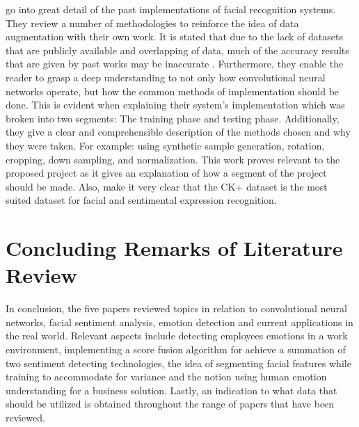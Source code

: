 \citeauthor{LOPES} go into great detail of the past implementations of facial recognition systems. They review a number of methodologies to reinforce the idea of data augmentation with their own work. It is stated that due to the lack of datasets that are publicly available and overlapping of data, much of the accuracy results that are given by past works may be inaccurate \citep{LOPES}. Furthermore, they enable the reader to grasp a deep understanding to not only how convolutional neural networks operate, but how the common methods of implementation should be done. This is evident when explaining their system's implementation which was broken into two segments: The training phase and testing phase. Additionally, they give a clear and comprehensible description of the methods chosen and why they were taken. For example: using synthetic sample generation, rotation, cropping, down sampling, and normalization. This work proves relevant to the proposed project as it gives an explanation of how a segment of the project should be made. Also, \citeauthor{LOPES} make it very clear that the CK+ dataset is the most suited dataset for facial and sentimental expression recognition. 

\section{Concluding Remarks of Literature Review}
In conclusion, the five papers reviewed topics in relation to convolutional neural networks, facial sentiment analysis, emotion detection and current applications in the real world. Relevant aspects include detecting employees emotions in a work environment, implementing a score fusion algorithm for achieve a summation of two sentiment detecting technologies, the idea of segmenting facial features while training to accommodate for variance and the notion using human emotion understanding for a business solution. Lastly, an indication to what data that should be utilized is obtained throughout the range of papers that have been reviewed.